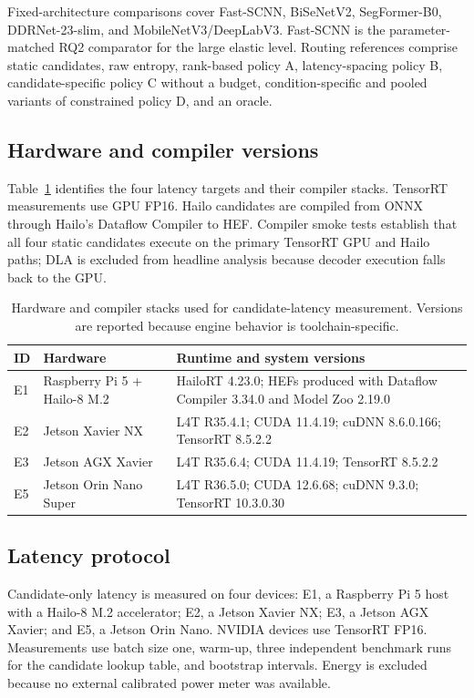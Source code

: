 \documentclass[a4paper,review,12pt]{elsarticle}
\begin{document}
Fixed-architecture comparisons cover Fast-SCNN, BiSeNetV2, SegFormer-B0, DDRNet-23-slim, and MobileNetV3/DeepLabV3. Fast-SCNN is the parameter-matched RQ2 comparator for the large elastic level. Routing references comprise static candidates, raw entropy, rank-based policy A, latency-spacing policy B, candidate-specific policy C without a budget, condition-specific and pooled variants of constrained policy D, and an oracle.

\subsection{Hardware and compiler versions}

Table~\ref{tab:hardware} identifies the four latency targets and their compiler stacks. TensorRT measurements use GPU FP16. Hailo candidates are compiled from ONNX through Hailo's Dataflow Compiler to HEF. Compiler smoke tests establish that all four static candidates execute on the primary TensorRT GPU and Hailo paths; DLA is excluded from headline analysis because decoder execution falls back to the GPU.

\begin{table}[H]
\centering
\caption{Hardware and compiler stacks used for candidate-latency measurement. Versions are reported because engine behavior is toolchain-specific.}
\label{tab:hardware}
\small
\begin{tabularx}{\textwidth}{@{}llX@{}}
\toprule
ID & Hardware & Runtime and system versions \\
\midrule
E1 & Raspberry Pi 5 + Hailo-8 M.2 & HailoRT 4.23.0; HEFs produced with Dataflow Compiler 3.34.0 and Model Zoo 2.19.0 \\
E2 & Jetson Xavier NX & L4T R35.4.1; CUDA 11.4.19; cuDNN 8.6.0.166; TensorRT 8.5.2.2 \\
E3 & Jetson AGX Xavier & L4T R35.6.4; CUDA 11.4.19; TensorRT 8.5.2.2 \\
E5 & Jetson Orin Nano Super & L4T R36.5.0; CUDA 12.6.68; cuDNN 9.3.0; TensorRT 10.3.0.30 \\
\bottomrule
\end{tabularx}
\end{table}

\subsection{Latency protocol}

Candidate-only latency is measured on four devices: E1, a Raspberry Pi 5 host with a Hailo-8 M.2 accelerator; E2, a Jetson Xavier NX; E3, a Jetson AGX Xavier; and E5, a Jetson Orin Nano. NVIDIA devices use TensorRT FP16. Measurements use batch size one, warm-up, three independent benchmark runs for the candidate lookup table, and bootstrap intervals. Energy is excluded because no external calibrated power meter was available.
\end{document}
